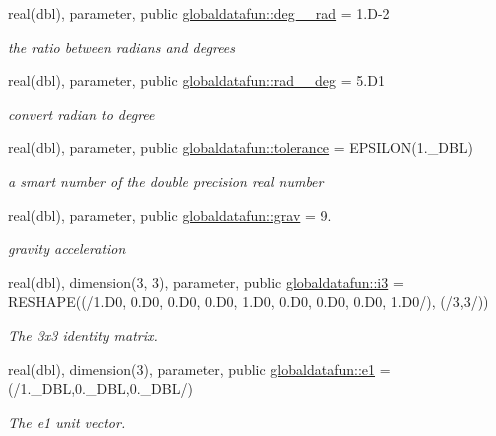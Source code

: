 \begin{DoxyCompactItemize}
\item 
real(dbl), parameter, public \hyperlink{namespaceglobaldatafun_a6cd96b1c5754b6f19020fd2ff826086d}{globaldatafun\+::deg\+\_\+\_\+rad} = 1.\+D-\/2
\begin{DoxyCompactList}\small\item\em the ratio between radians and degrees \end{DoxyCompactList}\item 
real(dbl), parameter, public \hyperlink{namespaceglobaldatafun_a65560765d885097ca1432983f9cf6bab}{globaldatafun\+::rad\+\_\+\_\+deg} = 5.\+D1
\begin{DoxyCompactList}\small\item\em convert radian to degree \end{DoxyCompactList}\item 
real(dbl), parameter, public \hyperlink{namespaceglobaldatafun_a163afcd0caf3537efef266782e451784}{globaldatafun\+::tolerance} = E\+P\+S\+I\+L\+ON(1.\+\_\+\+D\+B\+L)
\begin{DoxyCompactList}\small\item\em a smart number of the double precision real number \end{DoxyCompactList}\item 
real(dbl), parameter, public \hyperlink{namespaceglobaldatafun_a6ddc394879657b50856a10648f3af6bd}{globaldatafun\+::grav} = 9.
\begin{DoxyCompactList}\small\item\em gravity acceleration \end{DoxyCompactList}\item 
real(dbl), dimension(3, 3), parameter, public \hyperlink{namespaceglobaldatafun_abe3df2088f071e903ebdcf4734f6dc27}{globaldatafun\+::i3} = R\+E\+S\+H\+A\+PE((/1.D0, 0.D0, 0.D0, 0.D0, 1.D0, 0.D0, 0.D0, 0.D0, 1.D0/), (/3,3/))
\begin{DoxyCompactList}\small\item\em The 3x3 identity matrix. \end{DoxyCompactList}\item 
real(dbl), dimension(3), parameter, public \hyperlink{namespaceglobaldatafun_ae724ce0d8db999ac46505601fee29b3a}{globaldatafun\+::e1} =(/1.\+\_\+\+D\+BL,0.\+\_\+\+D\+BL,0.\+\_\+\+D\+BL/)
\begin{DoxyCompactList}\small\item\em The e1 unit vector. \end{DoxyCompactList}\item 

\end{DoxyCompactItemize}
